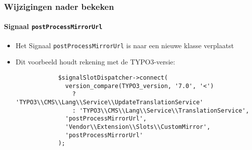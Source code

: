 \begin{frame}[fragile]
	\frametitle{Wijzigingen nader bekeken}
	\framesubtitle{Signaal \texttt{postProcessMirrorUrl}}

	\lstset{basicstyle=\tiny\ttfamily}

	\begin{itemize}

		\item Het Signaal \texttt{postProcessMirrorUrl} is naar een nieuwe klasse verplaatst

		\breakingchange

		\item Dit voorbeeld houdt rekening met de TYPO3-versie:

		\begin{lstlisting}
			$signalSlotDispatcher->connect(
			  version_compare(TYPO3_version, '7.0', '<')
			    ? 'TYPO3\\CMS\\Lang\\Service\\UpdateTranslationService'
			    : 'TYPO3\\CMS\\Lang\\Service\\TranslationService',
			  'postProcessMirrorUrl',
			  'Vendor\\Extension\\Slots\\CustomMirror',
			  'postProcessMirrorUrl'
			);
		\end{lstlisting}

	\end{itemize}

\end{frame}

